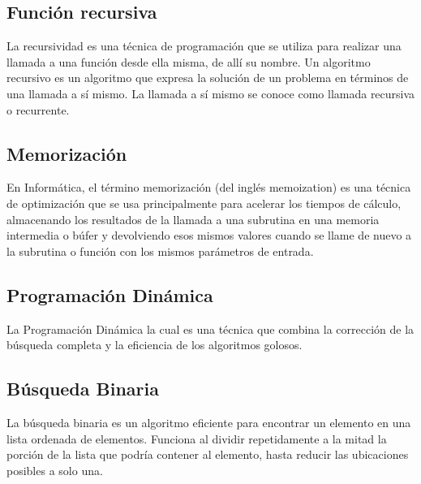 \subsection{Función recursiva}
La recursividad es una técnica de programación que se utiliza para realizar una llamada a una
función desde ella misma, de allí su nombre. Un algoritmo recursivo es un algoritmo que expresa la solución de un problema en términos
de una llamada a sí mismo. La llamada a sí mismo se conoce como llamada recursiva o recurrente.


\subsection{Memorización}
En Informática, el término memorización (del inglés memoization) es una técnica de optimización que se usa principalmente para acelerar los tiempos de cálculo, almacenando los resultados de la llamada a una subrutina en una memoria intermedia o búfer y devolviendo esos mismos valores cuando se llame de nuevo a la subrutina o función con los mismos parámetros de entrada. 


\subsection{Programación Dinámica}
La Programación Dinámica la cual es una técnica que combina la corrección de la búsqueda completa y la eficiencia de los algoritmos golosos.

\subsection{Búsqueda Binaria}
La búsqueda binaria es un algoritmo eficiente para encontrar un elemento en una lista ordenada de elementos. Funciona al dividir repetidamente a la mitad la porción de la lista que podría contener al elemento, hasta reducir las ubicaciones posibles a solo una. 
